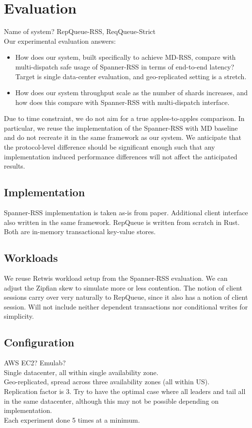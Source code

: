 \documentclass[letterpaper, 11pt]{article}
\begin{document}
\section{Evaluation}
Name of system? RepQueue-RSS, ReqQueue-Strict \\
Our experimental evaluation answers:
\begin{itemize}
\item How does our system, built specifically to achieve MD-RSS, compare with multi-dispatch safe usage of Spanner-RSS in terms of end-to-end latency? Target is single data-center evaluation, and geo-replicated setting is a stretch.
\item How does our system throughput scale as the number of shards increases, and how does this compare with Spanner-RSS with multi-dispatch interface.   
\end{itemize}
Due to time constraint, we do not aim for a true apples-to-apples comparison. In particular, we reuse the implementation of the Spanner-RSS with MD baseline and do not recreate it in the same framework as our system. We anticipate that the protocol-level difference should be significant enough such that any implementation induced performance differences will not affect the anticipated results. 

\subsection{Implementation}
Spanner-RSS implementation is taken as-is from paper. Additional client interface also written in the same framework. RepQueue is written from scratch in Rust. Both are in-memory transactional key-value stores.

\subsection{Workloads}
We reuse Retwis workload setup from the Spanner-RSS evaluation. We can adjust the Zipfian skew to simulate more or less contention. The notion of client sessions carry over very naturally to RepQueue, since it also has a notion of client session. Will not include neither dependent transactions nor conditional writes for simplicity. 

\subsection{Configuration}
AWS EC2? Emulab? \\
Single datacenter, all within single availability zone.\\
Geo-replicated, spread across three availability zones (all within US).\\
Replication factor is 3. Try to have the optimal case where all leaders and tail all in the same datacenter, although this may not be possible depending on implementation. \\
Each experiment done 5 times at a minimum. 
\end{document}

